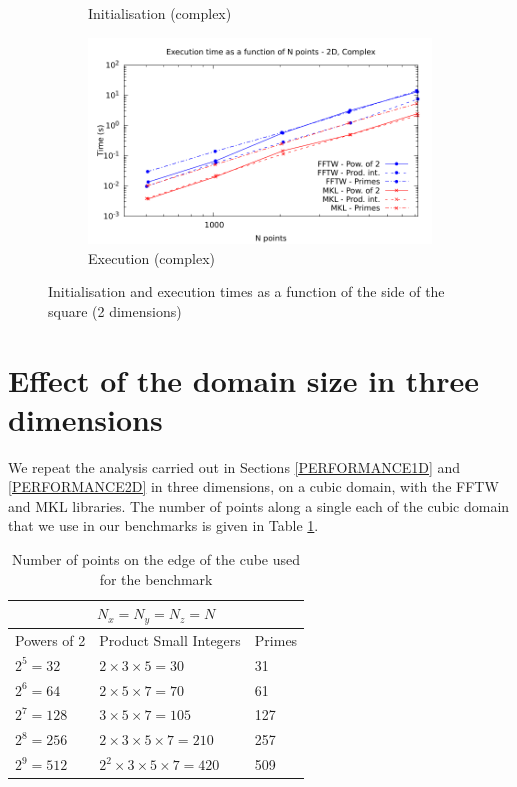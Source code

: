 \documentclass[12pt, a4paper]{article} \setlength{\textheight}{24cm}
\begin{document}
\begin{figure}[H]
\begin{subfigure}{.5\textwidth}
    \caption{Initialisation (complex)}
    \label{2DCI}
  \end{subfigure}%
  \begin{subfigure}{.5\textwidth}
    \centering
    \includegraphics[width=.9\linewidth]{graphs/2d-exec-c.pdf}
    \caption{Execution (complex)}
    \label{2DC}
  \end{subfigure}
  \caption{Initialisation and execution times as a function of the
    side of the square (2 dimensions)}
  \label{2D}
\end{figure}

\section{Effect of the domain size in three  dimensions}\label{PERFORMANCE3D}

We repeat the analysis carried out in Sections \ref{PERFORMANCE1D} and
\ref{PERFORMANCE2D} in three dimensions, on a cubic domain, with the
FFTW and MKL libraries. The number of points along a single each of
the cubic domain that we use in our benchmarks is given in Table
\ref{SIZES3D}.

\begin{table}[H]
  \centering
  \begin{tabular}{|l|l|l|}
    \hline
    \multicolumn{3}{|c|}{$N_x=N_y=N_z=N$}\\
    \hline
    \hline
    Powers of 2 & Product Small Integers & Primes\\ \hline
    $2^5=32$ & $2\times 3\times 5=30$	& 31\\ \hline
    $2^6=64$ & $2\times 5\times 7=70$	& 61\\ \hline
    $2^7=128$ & $3\times 5\times 7=105$ & 127\\ \hline
    $2^8=256$ & $2\times 3\times 5\times 7=210$ & 257\\ \hline
    $2^9=512$ & $2^2\times 3\times 5\times 7=420$ & 509\\ \hline
  \end{tabular}
  \caption{Number of points on the edge of the cube used for the
    benchmark}\label{SIZES3D}
\end{table}
\end{document}
